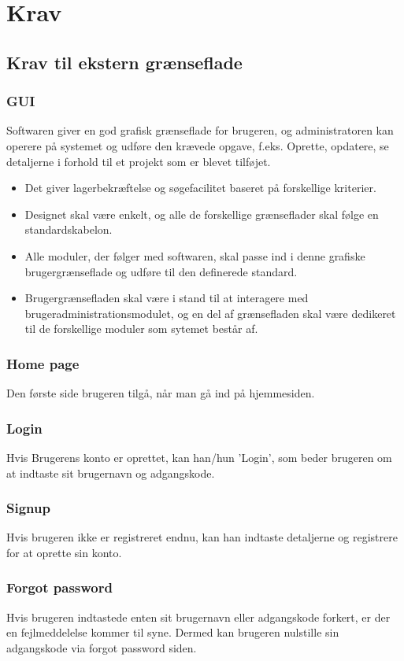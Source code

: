 \chapter{Krav}
\section{Krav til ekstern grænseflade}
\subsection{GUI}
Softwaren giver en god grafisk grænseflade for brugeren, og administratoren kan operere på systemet og udføre den krævede opgave, f.eks. Oprette, opdatere, se detaljerne i forhold til et projekt som er blevet tilføjet.

\begin{itemize}  
    \item Det giver lagerbekræftelse og søgefacilitet baseret på forskellige kriterier.
    \item Designet skal være enkelt, og alle de forskellige grænseflader skal følge en standardskabelon.
    \item Alle moduler, der følger med softwaren, skal passe ind i denne grafiske brugergrænseflade og udføre til den definerede standard.
    \item Brugergrænsefladen skal være i stand til at interagere med brugeradministrationsmodulet, og en del af grænsefladen skal være dedikeret til de forskellige moduler som sytemet består af.
\end{itemize}

\subsection{Home page}
Den første side brugeren tilgå, når man gå ind på hjemmesiden.
\subsection{Login}
Hvis Brugerens konto er oprettet, kan han/hun 'Login', som beder brugeren om at indtaste sit brugernavn og adgangskode.

\subsection{Signup}
 Hvis brugeren ikke er registreret endnu, kan han indtaste detaljerne og registrere for at oprette sin konto.

 \subsection{Forgot password}
 Hvis brugeren indtastede enten sit brugernavn eller adgangskode forkert, er der en fejlmeddelelse kommer til syne. Dermed kan brugeren nulstille sin adgangskode via forgot password siden. 

